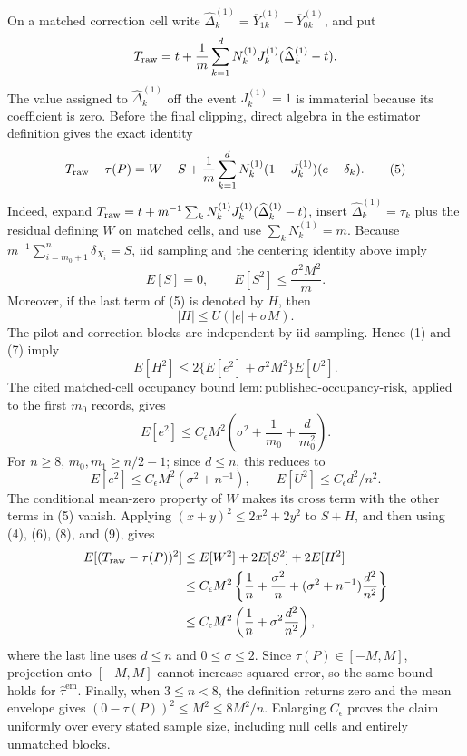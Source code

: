 On a matched correction cell write
\(
 \widehat\Delta_k^{(1)}=\overline Y_{1k}^{(1)}-\overline Y_{0k}^{(1)}
\), and put
\[
 T_{\rm raw}=t+\frac1m\sum_{k=1}^dN_k^{(1)}J_k^{(1)}
 (\widehat\Delta_k^{(1)}-t).
\]
The value assigned to \(\widehat\Delta_k^{(1)}\) off the event \(J_k^{(1)}=1\) is immaterial because its coefficient is zero.  Before the final clipping, direct algebra in the estimator definition gives the exact identity
\[
 T_{\rm raw}-\tau(P)
 =W+S+\frac1m\sum_{k=1}^dN_k^{(1)}(1-J_k^{(1)})(e-\delta_k). \tag{5}
\]
Indeed, expand \(T_{\rm raw}=t+m^{-1}\sum_kN_k^{(1)}J_k^{(1)}(\widehat\Delta_k^{(1)}-t)\), insert \(\widehat\Delta_k^{(1)}=\tau_k\) plus the residual defining \(W\) on matched cells, and use \(\sum_kN_k^{(1)}=m\).  Because \(m^{-1}\sum_{i=m_0+1}^n\delta_{X_i}=S\), iid sampling and the centering identity above imply
\[
 E[S]=0,\qquad E[S^2]\leq\frac{\sigma^2M^2}{m}. \tag{6}
\]
Moreover, if the last term of (5) is denoted by \(H\), then
\[
 |H|\leq U(|e|+\sigma M). \tag{7}
\]
The pilot and correction blocks are independent by iid sampling.  Hence (1) and (7) imply
\[
 E[H^2]
 \leq2\{E[e^2]+\sigma^2M^2\}E[U^2]. \tag{8}
\]
The cited matched-cell occupancy bound \(\mathrm{lem:published\text{-}occupancy\text{-}risk}\), applied to the first \(m_0\) records, gives
\[
 E[e^2]\leq C_{\epsilon}M^2
 \left(\sigma^2+\frac1{m_0}+\frac d{m_0^2}\right).
\]
For \(n\geq8\), \(m_0,m_1\geq n/2-1\); since \(d\leq n\), this reduces to
\[
 E[e^2]\leq C_{\epsilon}M^2(\sigma^2+n^{-1}),
 \qquad
 E[U^2]\leq C_{\epsilon}d^2/n^2. \tag{9}
\]
The conditional mean-zero property of \(W\) makes its cross term with the other terms in (5) vanish.  Applying \((x+y)^2\leq2x^2+2y^2\) to \(S+H\), and then using (4), (6), (8), and (9), gives
\[
 \begin{aligned}
 E[(T_{\rm raw}-\tau(P))^2]
 &\leq E[W^2]+2E[S^2]+2E[H^2]\\
 &\leq C_{\epsilon}M^2\left\{
 \frac1n+\frac{\sigma^2}{n}
 +(\sigma^2+n^{-1})\frac{d^2}{n^2}\right\}\\
 &\leq C_{\epsilon}M^2\left(\frac1n+\sigma^2\frac{d^2}{n^2}\right),
 \end{aligned}
\]
where the last line uses \(d\leq n\) and \(0\leq\sigma\leq2\).  Since \(\tau(P)\in[-M,M]\), projection onto \([-M,M]\) cannot increase squared error, so the same bound holds for \(\widehat\tau^{\mathrm{em}}\).  Finally, when \(3\leq n<8\), the definition returns zero and the mean envelope gives \((0-\tau(P))^2\leq M^2\leq8M^2/n\).  Enlarging \(C_{\epsilon}\) proves the claim uniformly over every stated sample size, including null cells and entirely unmatched blocks.

